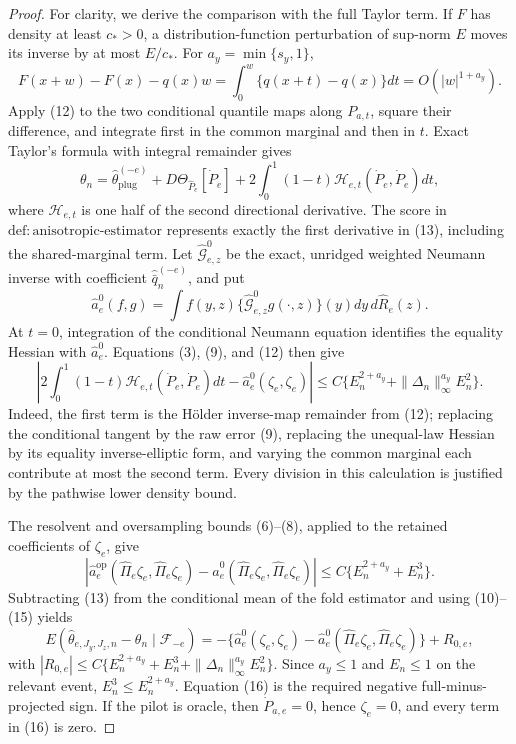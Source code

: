 \documentclass{article}
\begin{document}
\begin{proof}
For clarity, we derive the comparison with the full Taylor term.  If \(F\) has density at least \(c_* >0\), a distribution-function perturbation of sup-norm \(E\) moves its inverse by at most \(E/c_*\). For \(a_y=\min\{s_y,1\}\),
\[
F(x+w)-F(x)-q(x)w
=\int_0^w\{q(x+t)-q(x)\}dt=O(|w|^{1+a_y}).                     \tag{12}
\]
Apply (12) to the two conditional quantile maps along \(P_{a,t}\), square their difference, and integrate first in the common marginal and then in \(t\). Exact Taylor's formula with integral remainder gives
\[
\theta_n=\widehat\theta_{\mathrm{plug}}^{(-e)}
+D\Theta_{\widehat P_e}[\dot P_e]
+2\int_0^1(1-t)\mathcal H_{e,t}(\dot P_e,\dot P_e)dt,           \tag{13}
\]
where \(\mathcal H_{e,t}\) is one half of the second directional derivative. The score in \(\mathrm{def{:}anisotropic\text{-}estimator}\) represents exactly the first derivative in (13), including the shared-marginal term. Let \(\widehat{\mathcal G}^{0}_{e,z}\) be the exact, unridged weighted Neumann inverse with coefficient \(\widehat{\bar q}_n^{(-e)}\), and put
\[
\widehat a_e^0(f,g)=\int f(y,z)\{\widehat{\mathcal G}^{0}_{e,z}g(\cdot,z)\}(y)dy\,d\widehat R_e(z).
\]
At \(t=0\), integration of the conditional Neumann equation identifies the equality Hessian with \(\widehat a_e^0\). Equations (3), (9), and (12) then give
\[
\left|2\int_0^1(1-t)\mathcal H_{e,t}(\dot P_e,\dot P_e)dt
-\widehat a_e^0(\zeta_e,\zeta_e)\right|
\le C\{E_n^{2+a_y}+\|\Delta_n\|_\infty^{a_y}E_n^2\}.          \tag{14}
\]
Indeed, the first term is the H\"older inverse-map remainder from (12); replacing the conditional tangent by the raw error (9), replacing the unequal-law Hessian by its equality inverse-elliptic form, and varying the common marginal each contribute at most the second term. Every division in this calculation is justified by the pathwise lower density bound.

The resolvent and oversampling bounds (6)--(8), applied to the retained coefficients of \(\zeta_e\), give
\[
\left|\widehat a_e^{\mathrm{op}}(\widehat\Pi_e\zeta_e,\widehat\Pi_e\zeta_e)
-\widehat a_e^0(\widehat\Pi_e\zeta_e,\widehat\Pi_e\zeta_e)\right|
\le C\{E_n^{2+a_y}+E_n^3\}.                                    \tag{15}
\]
Subtracting (13) from the conditional mean of the fold estimator and using (10)--(15) yields
\[
E(\widehat\theta_{e,J_y,J_z,n}-\theta_n\mid\mathscr F_{-e})
=-\{\widehat a_e^0(\zeta_e,\zeta_e)
-\widehat a_e^0(\widehat\Pi_e\zeta_e,\widehat\Pi_e\zeta_e)\}
+R_{0,e},                                                        \tag{16}
\]
with \(|R_{0,e}|\le C\{E_n^{2+a_y}+E_n^3+\|\Delta_n\|_\infty^{a_y}E_n^2\}\). Since \(a_y\le1\) and \(E_n\le1\) on the relevant event, \(E_n^3\le E_n^{2+a_y}\). Equation (16) is the required negative full-minus-projected sign. If the pilot is oracle, then \(\dot P_{a,e}=0\), hence \(\zeta_e=0\), and every term in (16) is zero.


\end{proof}
\end{document}
